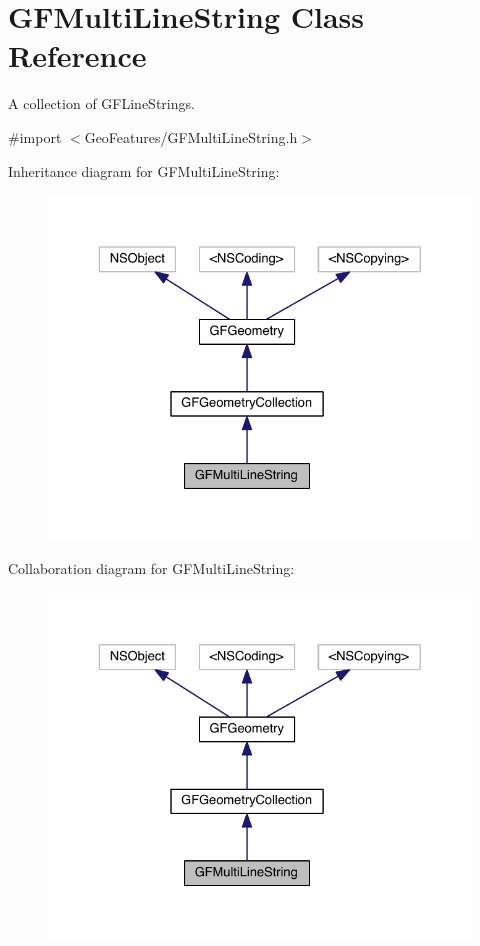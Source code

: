 \hypertarget{interface_g_f_multi_line_string}{}\section{G\+F\+Multi\+Line\+String Class Reference}
\label{interface_g_f_multi_line_string}


A collection of G\+F\+Line\+Strings.  




{\ttfamily \#import $<$Geo\+Features/\+G\+F\+Multi\+Line\+String.\+h$>$}



Inheritance diagram for G\+F\+Multi\+Line\+String\+:\nopagebreak
\begin{figure}[H]
\begin{center}
\leavevmode
\includegraphics[width=329pt]{interface_g_f_multi_line_string__inherit__graph}
\end{center}
\end{figure}


Collaboration diagram for G\+F\+Multi\+Line\+String\+:\nopagebreak
\begin{figure}[H]
\begin{center}
\leavevmode
\includegraphics[width=329pt]{interface_g_f_multi_line_string__coll__graph}
\end{center}
\end{figure}
